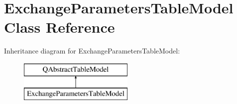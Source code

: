 \hypertarget{class_exchange_parameters_table_model}{}\section{Exchange\+Parameters\+Table\+Model Class Reference}
\label{class_exchange_parameters_table_model}
Inheritance diagram for Exchange\+Parameters\+Table\+Model\+:\begin{figure}[H]
\begin{center}
\leavevmode
\includegraphics[height=2.000000cm]{class_exchange_parameters_table_model}
\end{center}
\end{figure}

